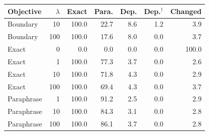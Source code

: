 \begin{tabular}{lrrrrrr}
\toprule
Objective & $\lambda$ & Exact & Para. & Dep. & Dep.$^{\dagger}$ & Changed \\
\midrule
Boundary & 10 & 100.0 & 22.7 & 8.6 & 1.2 & 3.9 \\
Boundary & 100 & 100.0 & 17.6 & 8.0 & 0.0 & 3.7 \\
Exact & 0 & 0.0 & 0.0 & 0.0 & 0.0 & 100.0 \\
Exact & 1 & 100.0 & 77.3 & 3.7 & 0.0 & 2.6 \\
Exact & 10 & 100.0 & 71.8 & 4.3 & 0.0 & 2.9 \\
Exact & 100 & 100.0 & 69.4 & 4.3 & 0.0 & 3.7 \\
Paraphrase & 1 & 100.0 & 91.2 & 2.5 & 0.0 & 2.9 \\
Paraphrase & 10 & 100.0 & 84.3 & 3.1 & 0.0 & 2.8 \\
Paraphrase & 100 & 100.0 & 86.1 & 3.7 & 0.0 & 2.8 \\
\bottomrule
\end{tabular}